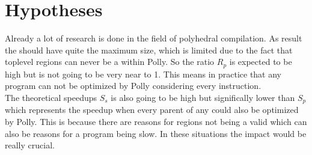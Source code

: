 \section{Hypotheses}
Already a lot of research is done in the field of polyhedral compilation.
As result the \scops should have quite the maximum size, which is limited due to the fact that toplevel regions can never be a \scop within Polly.
So the ratio \(R_p\) is expected to be high but is not going to be very near to 1.
This means in practice that any program can not be optimized by Polly considering every instruction.\\
The theoretical speedups \(S_s\) is also going to be high but significally lower than \(S_p\) which represents the speedup when every parent of any \scop could also be optimized by Polly.
This is because there are reasons for regions not being a valid \scop which can also be reasons for a program being slow.
In these situations the impact would be really crucial.

